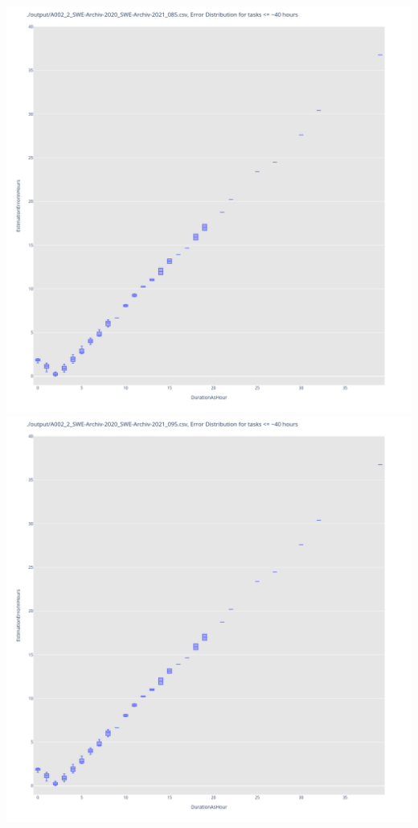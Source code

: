 \includegraphics[width=\textwidth]{Scripts/output/A002_2_SWE-Archiv-2020_SWE-Archiv-2021_085.csv.error_distribution.png}
\includegraphics[width=\textwidth]{Scripts/output/A002_2_SWE-Archiv-2020_SWE-Archiv-2021_095.csv.error_distribution.png}
